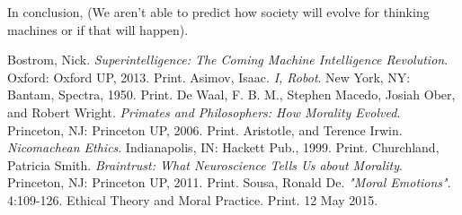 \documentclass[11pt, oneside]{article}
\begin{document}
\par In conclusion, (We aren't able to predict how society will evolve for thinking machines or if that will happen).

\begin{thebibliography}{9}
  Bostrom, Nick. 
  \emph{Superintelligence: The Coming Machine Intelligence Revolution}.
  Oxford: Oxford UP, 2013.
  Print.
  Asimov, Isaac.
  \emph{I, Robot}.
  New York, NY: Bantam, Spectra, 1950.
  Print.
  De Waal, F. B. M., Stephen Macedo, Josiah Ober, and Robert Wright.
  \emph{Primates and Philosophers: How Morality Evolved}.
  Princeton, NJ: Princeton UP, 2006.
  Print.
  Aristotle, and Terence Irwin.
  \emph{Nicomachean Ethics}.
  Indianapolis, IN: Hackett Pub., 1999.
  Print.
  Churchland, Patricia Smith.
  \emph{Braintrust: What Neuroscience Tells Us about Morality}.
  Princeton, NJ: Princeton UP, 2011. 
  Print.
  Sousa, Ronald De. 
  \emph{"Moral Emotions"}. 
  4:109-126. Ethical Theory and Moral Practice.
  Print. 12 May 2015.
\end{thebibliography}
\end{document}
